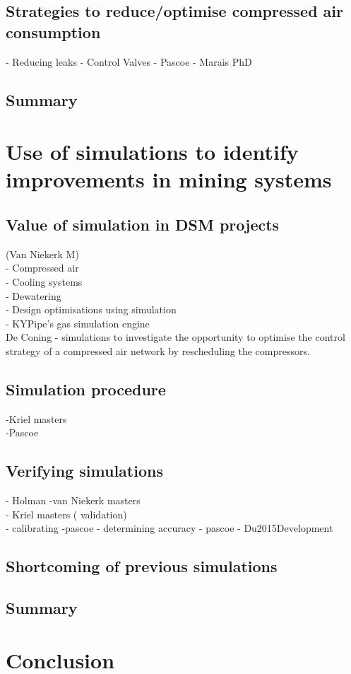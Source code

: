\subsection{Strategies to reduce/optimise compressed air consumption}
- Reducing leaks
- Control Valves - Pascoe
 - Marais PhD

	\subsection{Summary}
\section{Use of simulations to identify improvements in mining systems}
\subsection{Value of simulation in DSM projects}
(Van Niekerk M)\\
- Compressed air \\
- Cooling systems\\
- Dewatering\\
- Design optimisations using simulation\\
 - KYPipe’s gas simulation engine\\
De Coning -  simulations to investigate the opportunity to optimise the control strategy
of a compressed air network by rescheduling the compressors.
\subsection{Simulation procedure}
-Kriel masters\\
-Pascoe\\

 \subsection{Verifying simulations}
 - Holman
 -van Niekerk masters\\
 - Kriel masters ( validation)\\
 - calibrating -pascoe
 - determining accuracy - pascoe
 - Du2015Development
 
 \subsection{Shortcoming of previous simulations}
	\subsection{Summary}
\section{Conclusion}